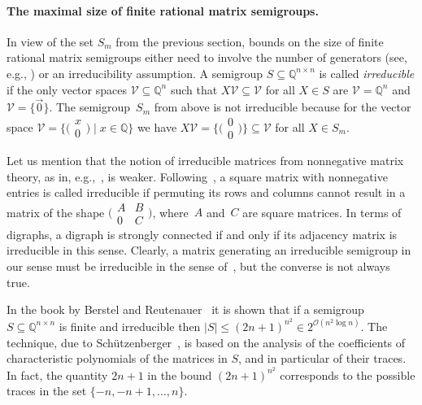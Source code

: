 \documentclass{lmcs}
\theoremstyle{definition}
\newcommand{\OO}{\mathcal{O}}
\newcommand{\Q}{\mathbb{Q}}
\newcommand{\V}{\mathcal{V}}
\begin{document}
\paragraph*{The maximal size of finite rational matrix semigroups.}

In view of the set $S_m$ from the previous section, bounds on the size of finite rational matrix semigroups either need to involve the number of generators (see, e.g., \cite{BumpusHKST20,Rida2025}) or an irreducibility assumption. A semigroup $S \subseteq \Q^{n \times n}$ is called \emph{irreducible} if the only vector spaces $\V \subseteq \Q^n$ such that $X \V \subseteq \V$ for all $X \in S$ are $\V = \Q^n$ and $\V = \{\vec{0}\}$. %
The semigroup~$S_m$ from above is not irreducible because for the vector space $\V = \{\big(\begin{smallmatrix} x \\ 0 \end{smallmatrix}\big) \mid x \in \Q\}$ we have $X \V = \{\big(\begin{smallmatrix} 0 \\ 0 \end{smallmatrix}\big)\} \subseteq \V$ for all $X \in S_m$.

Let us mention that the notion of irreducible matrices from nonnegative matrix theory, as in, e.g.,~\cite{Minc1988}, is weaker. Following~\cite{Minc1988}, a square matrix with nonnegative entries is called irreducible if permuting its rows and columns cannot result in a matrix of the shape $\big(\begin{smallmatrix}A & B \\ 0 & C\end{smallmatrix}\big)$, where~$A$ and~$C$ are square matrices. In terms of digraphs, a digraph is strongly connected if and only if its adjacency matrix is irreducible in this sense.
Clearly, a matrix generating an irreducible semigroup in our sense must be irreducible in the sense of~\cite{Minc1988}, but the converse is not always true.

In the book by Berstel and Reutenauer~\cite[Lemma~IX.1.2]{Berstel2011} it is shown that if a semigroup $S \subseteq \Q^{n \times n}$ is finite and irreducible then $|S| \le (2 n + 1)^{n^2} \in 2^{\OO(n^2 \log n)}$.
The technique, due to Sch{\"{u}}tzenberger~\cite{Schutzenberger62}, is based on the analysis of the coefficients of characteristic polynomials of the matrices in $S$, and in particular of their traces. In fact, the quantity $2 n + 1$ in the bound $(2 n + 1)^{n^2}$ corresponds to the possible traces in the set $\{-n, -n+1, \ldots, n\}$.
\end{document}
